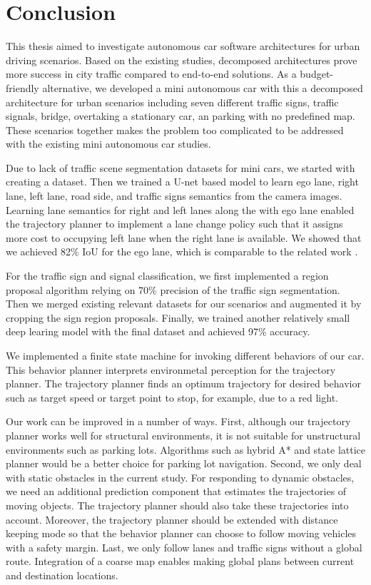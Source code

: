 \chapter{Conclusion}
\label{chp:b7}

This thesis aimed to investigate autonomous car software architectures for
urban driving scenarios. Based on the existing studies, decomposed
architectures prove more success in city traffic compared to end-to-end
solutions. As a budget-friendly alternative, we developed a mini autonomous car
with this a decomposed architecture for urban scenarios including seven
different traffic signs, traffic signals, bridge, overtaking a stationary car,
an parking with no predefined map. These scenarios together makes the problem
too complicated to be addressed with the existing mini autonomous car studies.

Due to lack of traffic scene segmentation datasets for mini cars, we started
with creating a dataset. Then we trained a U-net based model to learn ego lane,
right lane, left lane, road side, and traffic signs semantics from the camera
images. Learning lane semantics for right and left lanes along the with ego
lane enabled the trajectory planner to implement a lane change policy such that
it assigns more cost to occupying left lane when the right lane is available.
We showed that we achieved 82\% IoU for the ego lane, which is comparable to
the related work \cite{cite9}.

For the traffic sign and signal classification, we first implemented a region
proposal algorithm relying on 70\% precision of the traffic sign segmentation.
Then we merged existing relevant datasets for our scenarios and augmented it by
cropping the sign region proposals. Finally, we trained another relatively
small deep learing model with the final dataset and achieved 97\% accuracy.

We implemented a finite state machine for invoking different behaviors of our
car. This behavior planner interprets environmetal perception for the
trajectory planner. The trajectory planner finds an optimum trajectory for
desired behavior such as target speed or target point to stop, for example, due
to a red light.

Our work can be improved in a number of ways. First, although our trajectory
planner works well for structural environments, it is not suitable for
unstructural environments such as parking lots. Algorithms such as hybrid A*
and state lattice planner would be a better choice for parking lot navigation.
Second, we only deal with static obstacles in the current study. For responding
to dynamic obstacles, we need an additional prediction component that estimates
the trajectories of moving objects. The trajectory planner should also take
these trajectories into account. Moreover, the trajectory planner should be
extended with distance keeping mode so that the behavior planner can choose to
follow moving vehicles with a safety margin. Last, we only follow lanes and
traffic signs without a global route. Integration of a coarse map enables
making global plans between current and destination locations.

